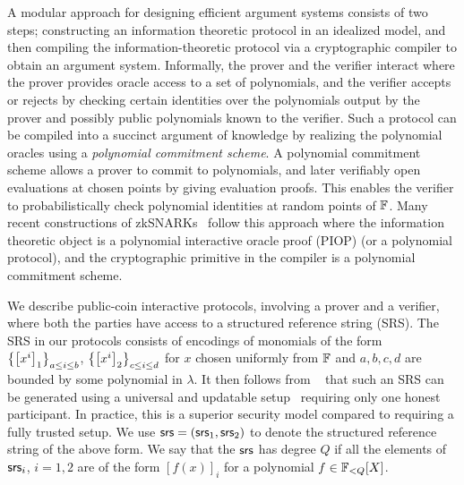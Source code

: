 A modular approach for designing efficient argument systems consists of two steps; constructing an information theoretic protocol in an idealized model, and then compiling the information-theoretic protocol via a cryptographic compiler to obtain an argument system. 
Informally, the prover and the verifier interact where the prover provides oracle access to a set of polynomials, and the verifier accepts or rejects by checking certain identities over the polynomials output by the prover and possibly public polynomials known to the verifier. Such a protocol can be compiled into a succinct argument of knowledge by realizing the polynomial oracles using a \emph{polynomial commitment scheme}. A polynomial commitment scheme allows a prover to commit to polynomials, and later verifiably open evaluations at chosen points by giving evaluation proofs. This enables the verifier to probabilistically
check polynomial identities at random points of $\mathbb{F}$. %
Many recent constructions of zkSNARKs~\cite{EC:BunFisSze20,EC:CHMMVW20,Gabizon2019PLONKPO} follow this approach where the information theoretic object is a polynomial interactive oracle proof (PIOP) (or a polynomial protocol), and the cryptographic primitive in the compiler is a polynomial commitment scheme.

 We describe public-coin interactive protocols, involving a prover and a verifier,
where both the parties have access to a structured reference string (SRS). The SRS in our protocols consists of
encodings of monomials of the form $\left\{\left[{x^i}\right]_1\right\}_{a\leq i\leq b}$, $\left\{\left[{x^i}\right]_2\right\}_{c\leq i\leq d}$
for $x$ chosen uniformly from $\mathbb{F}$ and $a,b,c,d$ are bounded by some polynomial in $\lambda$. It then follows
from ~\cite{EPRINT:BowGabMie17} that such an SRS can be generated using a universal and updatable setup~\cite{C:GKMMM18} requiring
only one honest participant. In practice, this is a superior security model compared to requiring a fully
trusted setup. We use $\mathsf{srs} = (\mathsf{srs}_1,\mathsf{srs}_2)$ to denote the structured reference string of the above form. We say
that the $\mathsf{srs}$ has degree $Q$ if all the elements of $\mathsf{srs}_i$, $i=1,2$ are of the form $[f(x)]_i$ for a
polynomial $f\in \mathbb{F}_{<Q}[X]$.

